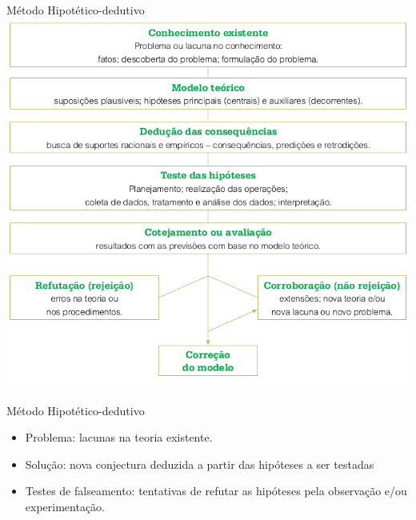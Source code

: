 \documentclass{beamer}
\begin{document}
\begin{frame}{Método Hipotético-dedutivo}
  \includegraphics[width=\textwidth]{metodo_hipotetico}
\end{frame}

\begin{frame}{Método Hipotético-dedutivo}
  \begin{itemize}
  \item Problema: lacunas na teoria existente.
  \item Solução: nova conjectura deduzida a partir das hipóteses a ser
    testadas
  \item Testes de falseamento: tentativas de refutar as hipóteses pela
    observação e/ou experimentação.
  \end{itemize}
\end{frame}





\end{document}
